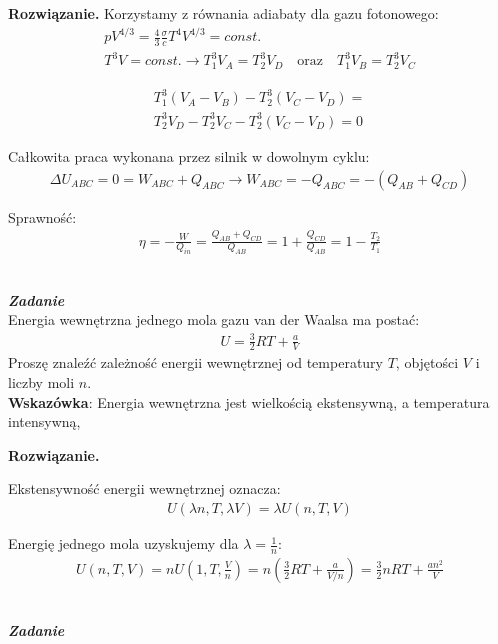 \documentclass[11pt,a4paper]{article}
\newcounter{zadanie}\newcommand{\zadanie}[1][]{\addtocounter{zadanie}{1} ~\\ {\bf \emph{Zadanie \arabic{zadanie} #1 }} \\}
\newenvironment{solution}{\vspace{1cm} \par\textbf{Rozwiązanie.} \vspace{1cm}}{}
\begin{document}
\begin{solution}
Korzystamy z równania adiabaty dla gazu fotonowego:
\begin{align*}
  pV^{4/3} = \frac{4}{3} \frac{\sigma}{c} T^4 V^{4/3} = const. \\
  T^{3}V = const. \to T_1^3 V_A = T_2^3 V_D \quad \text{oraz} \quad T_1^3 V_B = T_2^3 V_C
\end{align*}

\begin{align*}
  T_1^3 (V_A - V_B) - T_2^3 (V_C - V_D) =\\
  T_2^3 V_D - T_2^3 V_C - T_2^3 (V_C - V_D) = 0
\end{align*}

Całkowita praca wykonana przez silnik w dowolnym cyklu:
\begin{align*}
  \Delta U_{ABC} = 0 = W_{ABC} + Q_{ABC} \to W_{ABC} = - Q_{ABC} = -(Q_{AB} + Q_{CD})
\end{align*}

Sprawność:
\begin{align*}
  \eta = -\frac{W}{Q_{in}} = \frac{Q_{AB} + Q_{CD}}{Q_{AB}} = 1 + \frac{Q_{CD}}{Q_{AB}} = 1 - \frac{T_2}{T_1}
\end{align*}

\newpage   
\end{solution}

\zadanie[]

Energia wewnętrzna jednego mola gazu van der Waalsa ma postać:
\begin{align*}
  U = \frac{3}{2} RT + \frac{a}{V}
\end{align*}
Proszę znaleźć zależność energii wewnętrznej od temperatury $T$, objętości $V$ i liczby moli $n$.\\

{\bf Wskazówka}: Energia wewnętrzna jest wielkością ekstensywną, a temperatura intensywną,

\begin{solution}

 Ekstensywność energii wewnętrznej oznacza:
 \begin{align*}
  U(\lambda n, T, \lambda V) = \lambda U(n, T, V)
 \end{align*}

 Energię jednego mola uzyskujemy dla $\lambda = \frac{1}{n}$:
\begin{align*}
  U(n, T, V) = n U\left(1, T, \frac{V}{n}\right) = n \left( \frac{3}{2} RT + \frac{a}{V/n} \right) = 
  \frac{3}{2} n R T + \frac{a n^2}{V}
\end{align*}

\newpage   
\end{solution}
\zadanie[]
\end{document}
